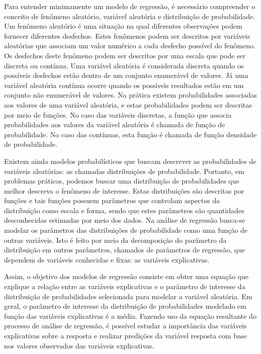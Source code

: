 Para entender minimamente um modelo de regressão, é necessário compreender o conceito de fenômeno aleatório, variável aleatória e distribuição de probabilidade. Um fenômeno aleatório é uma situação na qual diferentes observações podem fornecer diferentes desfechos. Estes fenômenos podem ser descritos por variáveis aleatórias que associam um valor numérico a cada desfecho possível do fenômeno. Os desfechos deste fenômeno podem ser descritos por uma escala que pode ser discreta ou contínua. Uma variável aleatória é considerada discreta quando os possíveis desfechos estão dentro de um conjunto enumerável de valores. Já uma variável aleatória contínua ocorre quando os possíveis resultados estão em um conjunto não enumerável de valores. Na prática existem probabilidades associadas aos valores de uma variável aleatória, e estas probabilidades podem ser descritas por meio de funções. No caso das variáveis discretas, a função que associa probabilidades aos valores da variável aleatória é chamada de função de probabilidade. No caso das contínuas, esta função é chamada de função densidade de probabilidade.

Existem ainda modelos probabilísticos que buscam descrever as probabilidades de variáveis aleatórias: as chamadas distribuições de probabilidade. Portanto, em problemas práticos, podemos buscar uma distribuição de probabilidades que melhor descreva o fenômeno de interesse. Estas distribuições são descritas por funções e tais funções possuem parâmetros que controlam aspectos da distribuição como escala e forma, sendo que estes parâmetros são quantidades desconhecidas estimadas por meio dos dados. Na análise de regressão busca-se modelar os parâmetros das distribuições de probabilidade como uma função de outras variáveis. Isto é feito por meio da decomposição do parâmetro da distribuição em outros parâmetros, chamados de parâmetros de regressão, que dependem de variáveis conhecidas e fixas: as variáveis explicativas.  

Assim, o objetivo dos modelos de regressão consiste em obter uma equação que explique a relação entre as variáveis explicativas e o parâmetro de interesse da distribuição de probabilidades selecionada para modelar a variável aleatória. Em geral, o parâmetro de interesse da distribuição de probabilidades modelado em função das variáveis explicativas é a média. Fazendo uso da equação resultante do processo de análise de regressão, é possível estudar a importância das variáveis explicativas sobre a resposta e realizar predições da variável resposta com base nos valores observados das variáveis explicativas. 

